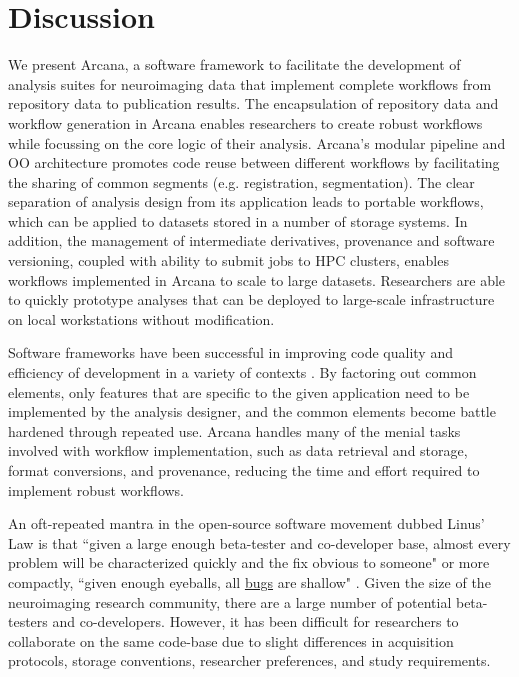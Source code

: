\documentclass[smallextended]{svjour3}       %
\begin{document}
\section*{Discussion}
\label{discussion}

We present Arcana, a software framework to facilitate the development of
analysis suites for neuroimaging data that implement
complete workflows from repository data to publication results. The
encapsulation of repository data and workflow generation in Arcana
enables researchers to create robust workflows while focussing on the
core logic of their analysis. Arcana's modular pipeline and OO
architecture promotes code reuse between different workflows by
facilitating the sharing of common segments (e.g. registration,
segmentation). The clear separation of analysis design from its
application leads to portable workflows, which can be applied to
datasets stored in a number of storage systems. In addition, the
management of intermediate derivatives, provenance and software
versioning, coupled with ability to submit jobs to HPC clusters, enables
workflows implemented in Arcana to scale to large datasets. Researchers
are able to quickly prototype analyses that can be deployed to large-scale
infrastructure on local workstations without modification.

Software frameworks \citep{yacoub_pattern-oriented_2004} have been successful in
improving code quality and efficiency of development in a variety of
contexts \citep{moore_professional_2008,white_hadoop:_2012,abadi_tensorflow:_2016}. By
factoring out common elements, only features that are specific to the
given application need to be implemented by the analysis designer, and
the common elements become battle hardened through repeated use. Arcana
handles many of the menial tasks involved with workflow implementation,
such as data retrieval and storage, format conversions, and provenance,
reducing the time and effort required to implement robust workflows.

An oft-repeated mantra in the open-source software movement dubbed
Linus' Law is that ``given a large enough beta-tester and co-developer
base, almost every problem will be characterized quickly and the fix
obvious to someone" or more compactly, ``given enough eyeballs, all
\href{https://en.wikipedia.org/wiki/Software_bug}{bugs} are shallow"
\citep{raymond_cathedral_1999}. Given the size of the neuroimaging research community,
there are a large number of potential beta-testers and co-developers.
However, it has been difficult for researchers to collaborate on the
same code-base due to slight differences in acquisition protocols,
storage conventions, researcher preferences, and study requirements.
\end{document}
